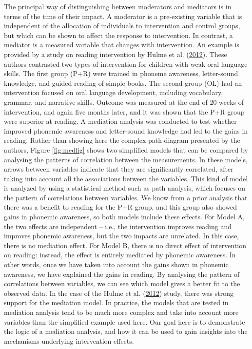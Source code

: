 \documentclass{krantz}
\begin{document}
The principal way of distinguishing between moderators and mediators is in terms of the time of their impact. A moderator is a pre-existing variable that is independent of the allocation of individuals to intervention and control groups, but which can be shown to affect the response to intervention. In contrast, a mediator is a measured variable that changes with intervention. An example is provided by a study on reading intervention by Hulme et al. (\protect\hyperlink{ref-hulme2012}{2012}). These authors contrasted two types of intervention for children with weak oral language skills. The first group (P+R) were trained in phoneme awareness, letter-sound knowledge, and guided reading of simple books. The second group (OL) had an intervention focused on oral language development, including vocabulary, grammar, and narrative skills. Outcome was measured at the end of 20 weeks of intervention, and again five months later, and it was shown that the P+R group were superior at reading. A mediation analysis  was conducted to test whether improved phonemic awareness and letter-sound knowledge had led to the gains in reading. Rather than showing here the complex path diagram presented by the authors, Figure \ref{fig:medfig} shows two simplified models that can be compared by analysing the patterns of correlation between the measurements. In these models, arrows between variables indicate that they are significantly correlated, after taking into account all the associations between the variables. This kind of model is analyzed by using a statistical method such as path analysis, which focuses on the pattern of correlations between variables. We know from a prior analysis that there was a benefit to reading for the P+R group, and this group also showed gains in phonemic awareness, so both models include these effects. For Model A, the two effects are independent -- i.e., the intervention improves reading and improves phonemic awareness, but the two impacts are unrelated. In this case, there is no mediation effect. For Model B, there is no direct effect of intervention on reading: instead, the effect is entirely mediated by phonemic awareness. In other words, once we have taken into account the gains shown in phonemic awareness, we have explained the gains in reading. By analysing the pattern of correlations between variables, we can see which model gives a better fit to the observed data. In the case of the Hulme et al. (\protect\hyperlink{ref-hulme2012}{2012}) study, there was strong support for the mediation model. In practice, the models that are tested in mediation analysis tend to be much more complex and take into account more variables than the simplified example used here. Our goal here is to demonstrate the logic of a mediation analysis, and how it can be used to gain insights into the mechanisms underlying intervention effects.
\end{document}
